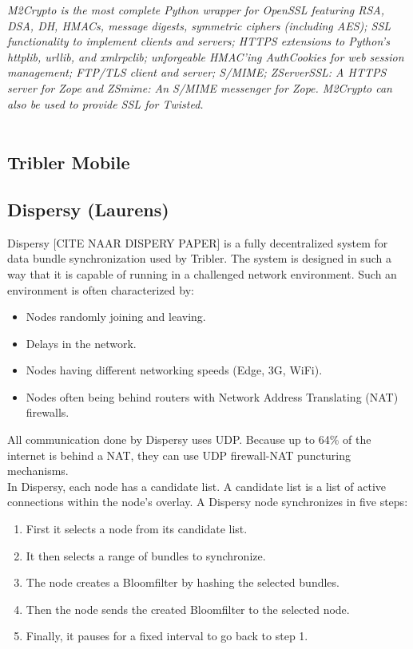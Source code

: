 \documentclass[11pt]{article}
\begin{document}
\emph{M2Crypto is the most complete Python wrapper for OpenSSL featuring RSA, DSA, DH, HMACs, message digests, symmetric ciphers (including AES); SSL functionality to implement clients and servers; HTTPS extensions to Python's httplib, urllib, and xmlrpclib; unforgeable HMAC'ing AuthCookies for web session management; FTP/TLS client and server; S/MIME; ZServerSSL: A HTTPS server for Zope and ZSmime: An S/MIME messenger for Zope. M2Crypto can also be used to provide SSL for Twisted.}\\\\

\subsection{Tribler Mobile}

\subsection{Dispersy (Laurens)}
Dispersy [CITE NAAR DISPERY PAPER] is a fully decentralized system for data bundle synchronization used by Tribler. The system is designed in such a way that it is capable of running in a challenged network environment. Such an environment is often characterized by:
\begin{itemize}
\item Nodes randomly joining and leaving.
\item Delays in the network.
\item Nodes having different networking speeds (Edge, 3G, WiFi).
\item Nodes often being behind routers with Network Address Translating (NAT) firewalls.
\end{itemize}

All communication done by Dispersy uses UDP. Because up to 64\% of the internet is behind a NAT, they can use UDP firewall-NAT puncturing mechanisms.\\

In Dispersy, each node has a candidate list. A candidate list is a list of active connections within the node's overlay. A Dispersy node synchronizes in five steps:

\begin{enumerate}
\item First it selects a node from its candidate list.
\item It then selects a range of bundles to synchronize.
\item The node creates a Bloomfilter by hashing the selected bundles.
\item Then the node sends the created Bloomfilter to the selected node.
\item Finally, it pauses for a fixed interval to go back to step 1.
\end{enumerate}
\end{document}
